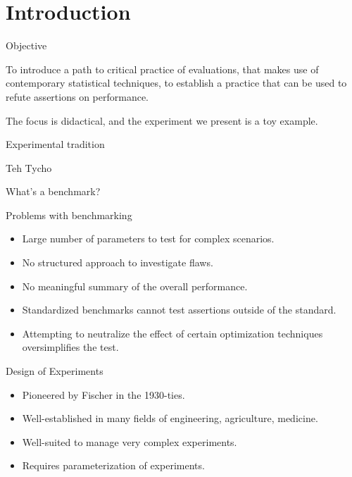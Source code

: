 \documentclass[english,handout,aspectratio=169]{ifislide}
\author{Kjetil Kjernsmo}
\begin{document}
\IfiTitleSlide     %



\section{Introduction} 

\begin{frame}{Objective}

To introduce a path to critical practice of evaluations, that makes
use of contemporary statistical techniques, to establish a practice
that can be used to refute assertions on performance.

The focus is didactical, and the experiment we present is a toy
example.

\end{frame}


\begin{frame}{Experimental tradition}

Teh Tycho

\end{frame}



\begin{frame}{What's a benchmark?}
\end{frame}

\begin{frame}{Problems with benchmarking}

\begin{itemize}
\item Large number of parameters to test for complex scenarios.
\item No structured approach to investigate flaws.
\item No meaningful summary of the overall performance.
\item Standardized benchmarks cannot test assertions outside of the
  standard.
\item Attempting to neutralize the effect of certain optimization
  techniques oversimplifies the test.
\end{itemize}
\end{frame}

\begin{frame}{Design of Experiments}

  \begin{itemize}
  \item Pioneered by Fischer in the 1930-ties.
  \item Well-established in many fields of engineering, agriculture,
    medicine.
  \item Well-suited to manage very complex experiments.
  \item Requires parameterization of experiments.
  \end{itemize}
\end{frame}
\end{document}
